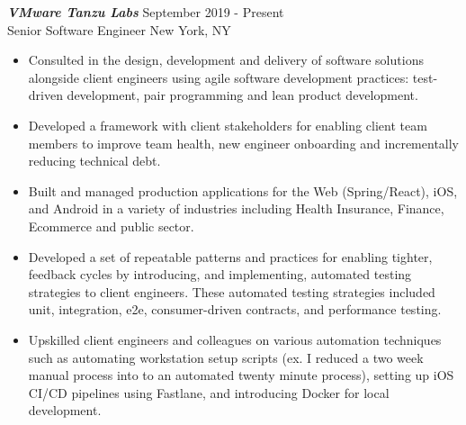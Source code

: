 {\sl \textbf{VMware Tanzu Labs}} \hfill September 2019 - Present \\ Senior Software Engineer \hfill New York, NY
\begin{itemize}
    \item Consulted in the design, development and delivery of software solutions alongside client engineers using agile software development practices: test-driven development, pair programming and lean product development.
    \item Developed a framework with client stakeholders for enabling client team members to improve team health, new engineer onboarding and incrementally reducing technical debt.
    \item Built and managed production applications for the Web (Spring/React), iOS, and Android in a variety of industries including Health Insurance, Finance, Ecommerce and public sector.
    \item Developed a set of repeatable patterns and practices for enabling tighter, feedback cycles by introducing, and implementing, automated testing strategies to client engineers. These automated testing strategies included unit, integration, e2e, consumer-driven contracts, and performance testing.
    \item Upskilled client engineers and colleagues on various automation techniques such as automating workstation setup scripts (ex. I reduced a two week manual process into to an automated twenty minute process), setting up iOS CI/CD pipelines using Fastlane, and introducing Docker for local development.
\end{itemize}
